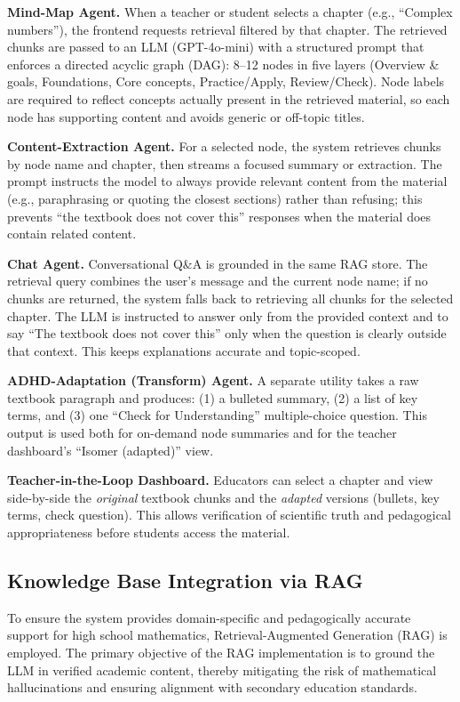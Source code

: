 \documentclass[sigplan,screen]{acmart}
\begin{document}
\textbf{Mind-Map Agent.} When a teacher or student selects a chapter (e.g., ``Complex numbers''), the frontend requests retrieval filtered by that chapter. The retrieved chunks are passed to an LLM (GPT-4o-mini) with a structured prompt that enforces a directed acyclic graph (DAG): 8--12 nodes in five layers (Overview \& goals, Foundations, Core concepts, Practice/Apply, Review/Check). Node labels are required to reflect concepts actually present in the retrieved material, so each node has supporting content and avoids generic or off-topic titles.

\textbf{Content-Extraction Agent.} For a selected node, the system retrieves chunks by node name and chapter, then streams a focused summary or extraction. The prompt instructs the model to always provide relevant content from the material (e.g., paraphrasing or quoting the closest sections) rather than refusing; this prevents ``the textbook does not cover this'' responses when the material does contain related content.

\textbf{Chat Agent.} Conversational Q\&A is grounded in the same RAG store. The retrieval query combines the user's message and the current node name; if no chunks are returned, the system falls back to retrieving all chunks for the selected chapter. The LLM is instructed to answer only from the provided context and to say ``The textbook does not cover this'' only when the question is clearly outside that context. This keeps explanations accurate and topic-scoped.

\textbf{ADHD-Adaptation (Transform) Agent.} A separate utility takes a raw textbook paragraph and produces: (1) a bulleted summary, (2) a list of key terms, and (3) one ``Check for Understanding'' multiple-choice question. This output is used both for on-demand node summaries and for the teacher dashboard's ``Isomer (adapted)'' view.

\textbf{Teacher-in-the-Loop Dashboard.} Educators can select a chapter and view side-by-side the \emph{original} textbook chunks and the \emph{adapted} versions (bullets, key terms, check question). This allows verification of scientific truth and pedagogical appropriateness before students access the material.

\subsection{Knowledge Base Integration via RAG}
To ensure the system provides domain-specific and pedagogically accurate support for high school mathematics, Retrieval-Augmented Generation (RAG) is employed. The primary objective of the RAG implementation is to ground the LLM in verified academic content, thereby mitigating the risk of mathematical hallucinations and ensuring alignment with secondary education standards.
\end{document}

